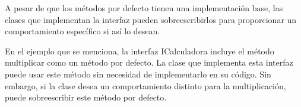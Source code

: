\begin{center}
	A pesar de que los métodos por defecto tienen una implementación base, las clases que implementan la interfaz pueden 
	sobreescribirlos para proporcionar un comportamiento específico si así lo desean.

	En el ejemplo que se menciona, la interfaz ICalculadora incluye el método multiplicar como un método por defecto. 
	La clase que implementa esta interfaz puede usar este método sin necesidad de implementarlo en su código.
	Sin embargo, si la clase desea un comportamiento distinto para la multiplicación, puede sobreescribir este método por defecto.

\end{center}


